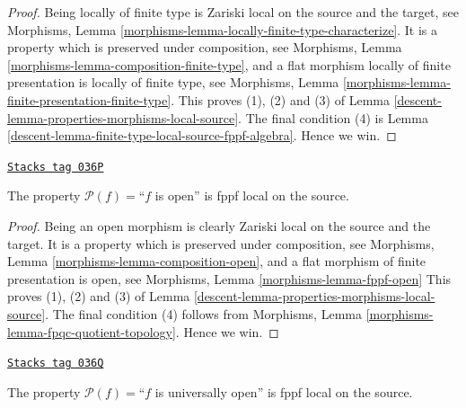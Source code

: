 \begin{proof}

Being locally of finite type is Zariski local on the source
and the target, see Morphisms,
Lemma \ref{morphisms-lemma-locally-finite-type-characterize}.
It is a property which is preserved under composition, see
Morphisms, Lemma \ref{morphisms-lemma-composition-finite-type}, and
a flat morphism locally of finite presentation is locally of finite type, see
Morphisms, Lemma \ref{morphisms-lemma-finite-presentation-finite-type}.
This proves
(1), (2) and (3) of Lemma \ref{descent-lemma-properties-morphisms-local-source}.
The final condition (4) is
Lemma \ref{descent-lemma-finite-type-local-source-fppf-algebra}. Hence we win.
\end{proof}

\begin{lemma}
\label{descent-lemma-open-fppf-local-source}
\href{https://stacks.math.columbia.edu/tag/036P}{\texttt{Stacks tag 036P}}

The property $\mathcal{P}(f)=$``$f$ is open''
is fppf local on the source.
\end{lemma}

\begin{proof}

Being an open morphism is clearly Zariski local on the source and the target.
It is a property which is preserved under composition, see
Morphisms, Lemma \ref{morphisms-lemma-composition-open}, and
a flat morphism of finite presentation is open, see
Morphisms, Lemma \ref{morphisms-lemma-fppf-open}
This proves
(1), (2) and (3) of Lemma \ref{descent-lemma-properties-morphisms-local-source}.
The final condition (4) follows from
Morphisms, Lemma \ref{morphisms-lemma-fpqc-quotient-topology}.
Hence we win.
\end{proof}

\begin{lemma}
\label{descent-lemma-universally-open-fppf-local-source}
\href{https://stacks.math.columbia.edu/tag/036Q}{\texttt{Stacks tag 036Q}}

The property $\mathcal{P}(f)=$``$f$ is universally open''
is fppf local on the source.
\end{lemma}

